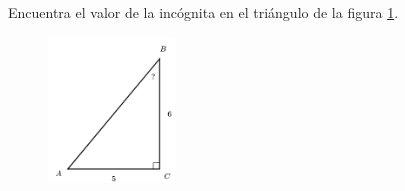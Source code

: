 \question[15]  Encuentra el valor de la incógnita en el triángulo de la figura \ref{fig:angle_functrig_24}.
\begin{figure}[H]
    \begin{center}
        \includegraphics[width=0.3\textwidth]{../images/angle_functrig_24.png}
    \end{center}
    \caption{}
    \label{fig:angle_functrig_24}
\end{figure}